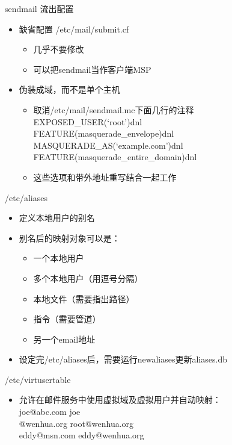 \begin{frame}{sendmail 流出配置}
\begin{itemize}
\item 缺省配置 /etc/mail/submit.cf

\begin{itemize}
\item 几乎不要修改
\item 可以把sendmail当作客户端MSP
\end{itemize}
\item 伪装成域，而不是单个主机

\begin{itemize}
\item 取消/etc/mail/sendmail.mc下面几行的注释\\
EXPOSED\_USER(`root')dnl\\
FEATURE(masquerade\_envelope)dnl\\
MASQUERADE\_AS(`example.com')dnl\\
FEATURE(masquerade\_entire\_domain)dnl
\item 这些选项和带外地址重写结合一起工作
\end{itemize}
\end{itemize}

\end{frame} 
\begin{frame}{/etc/aliases}
\begin{itemize}
\item 定义本地用户的别名
\item 别名后的映射对象可以是：

\begin{itemize}
\item 一个本地用户
\item 多个本地用户（用逗号分隔）
\item 本地文件（需要指出路径）
\item 指令（需要管道）
\item 另一个email地址
\end{itemize}
\item 设定完/etc/aliases后，需要运行newaliases更新aliases.db
\end{itemize}

\end{frame} 
\begin{frame}{/etc/virtusertable}


\begin{itemize}
\item 允许在邮件服务中使用虚拟域及虚拟用户并自动映射：\\
joe@abc.com joe\\
@wenhua.org root@wenhua.org \\
eddy@msn.com eddy@wenhua.org
\end{itemize}

\end{frame} 
